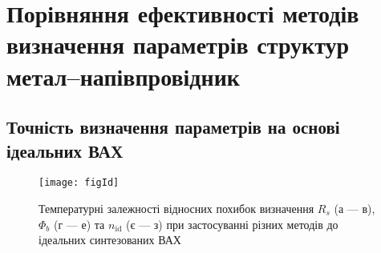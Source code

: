 \section{Порівняння ефективності методів визначення параметрів структур метал--напівпровідник}

\subsection{Точність визначення параметрів на основі ідеальних ВАХ}

\begin{figure}
\center
\texttt{[image: figId]}%
\caption{\label{figId}
Температурні залежності відносних похибок визначення $R_s$ (а --- в), $\Phi_b$ (г --- е) та $n_\mathrm{id}$ (є --- з) при застосуванні різних методів до ідеальних синтезованих ВАХ
}
\end{figure}

